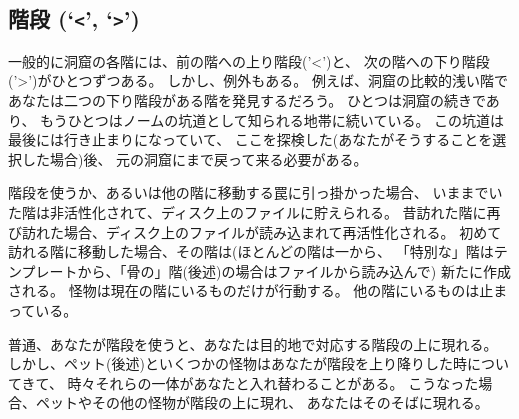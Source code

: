 \subsection*{階段 (`{\tt <}', `{\tt >}')}

一般的に洞窟の各階には、前の階への上り階段('<')と、
次の階への下り階段('>')がひとつずつある。
しかし、例外もある。
例えば、洞窟の比較的浅い階であなたは二つの下り階段がある階を発見するだろう。
ひとつは洞窟の続きであり、
もうひとつはノームの坑道として知られる地帯に続いている。
この坑道は最後には行き止まりになっていて、
ここを探検した(あなたがそうすることを選択した場合)後、
元の洞窟にまで戻って来る必要がある。

% 
階段を使うか、あるいは他の階に移動する罠に引っ掛かった場合、
いままでいた階は非活性化されて、ディスク上のファイルに貯えられる。
昔訪れた階に再び訪れた場合、ディスク上のファイルが読み込まれて再活性化される。
初めて訪れる階に移動した場合、その階は(ほとんどの階は一から、
「特別な」階はテンプレートから、「骨の」階(後述)の場合はファイルから読み込んで)
新たに作成される。
怪物は現在の階にいるものだけが行動する。
他の階にいるものは止まっている。

普通、あなたが階段を使うと、あなたは目的地で対応する階段の上に現れる。
しかし、ペット(後述)といくつかの怪物はあなたが階段を上り降りした時についてきて、
時々それらの一体があなたと入れ替わることがある。
こうなった場合、ペットやその他の怪物が階段の上に現れ、
あなたはそのそばに現れる。

